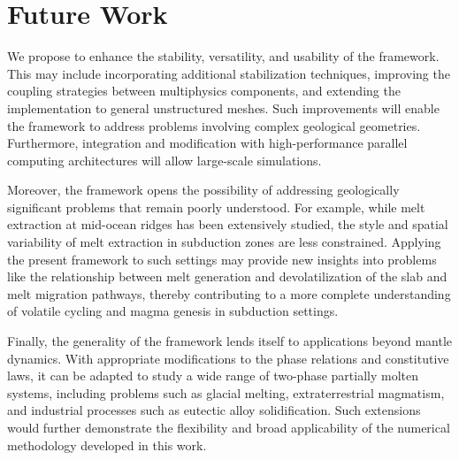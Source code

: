 \section{Future Work}

We propose to enhance the stability, versatility, and usability of the framework. This may include incorporating 
additional stabilization techniques, improving the coupling strategies between multiphysics components, and extending 
the implementation to general unstructured meshes. Such improvements will enable the framework to address problems 
involving complex geological geometries. Furthermore, integration and modification with high-performance parallel computing architectures will 
allow large-scale simulations.

Moreover, the framework opens the possibility of addressing geologically significant problems that remain poorly understood. 
For example, while melt extraction at mid-ocean ridges has been extensively studied, the style and spatial 
variability of melt extraction in subduction zones are less constrained. Applying the present framework to such 
settings may provide new insights into problems like the relationship between melt generation and devolatilization of the slab
and melt migration pathways, thereby contributing to a more complete understanding of volatile cycling and magma genesis in 
subduction settings.

Finally, the generality of the framework lends itself to applications beyond mantle dynamics. 
With appropriate modifications to the phase relations and constitutive laws, it can be adapted to study a wide range 
of two-phase partially molten systems, including problems such as glacial melting, extraterrestrial magmatism,
and industrial processes such as eutectic alloy solidification.
Such extensions would further demonstrate the flexibility and broad applicability of the numerical 
methodology developed in this work.
